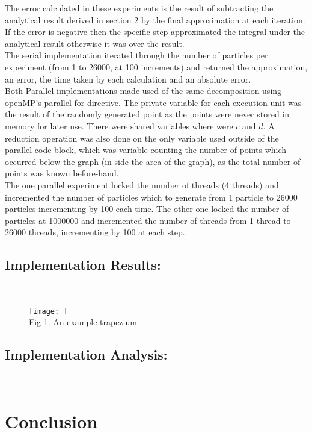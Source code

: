 \documentclass[11pt]{article}
\begin{document}
\begin{page}
\noindent The error calculated in these experiments is the result of subtracting the analytical result derived in section 2 by the final approximation at each iteration. If the error is negative then the specific step approximated the integral under the analytical result otherwise it was over the result.\\

\noindent The serial implementation iterated through the number of particles per experiment (from 1 to 26000, at 100 increments) and returned the approximation, an error, the time taken by each calculation and an absolute error.\\

\noindent Both Parallel implementations made used of the same decomposition using openMP's parallel for directive. The private variable for each execution unit was the result of the randomly generated point as the points were never stored in memory for later use. There were shared variables where were $c$ and $d$. A reduction operation was also done on the only variable used outside of the parallel code block, which was variable counting the number of points which occurred below the graph (in side the area of the graph), as the total number of points was known before-hand.\\

\noindent The one parallel experiment locked the number of threads (4 threads) and incremented the number of particles which to generate from 1 particle to 26000 particles incrementing by 100 each time. The other one locked the number of particles at 1000000 and incremented the number of threads from 1 thread to 26000 threads, incrementing by 100 at each step.


\subsection{Implementation Results:}\\
\begin{figure}[ht]
\centering
     \texttt{[image: ]}\\
     Fig 1. An example trapezium
\end{figure}

\subsection{Implementation Analysis:}\\ 

\section{Conclusion}



\end{page}
\end{document}
